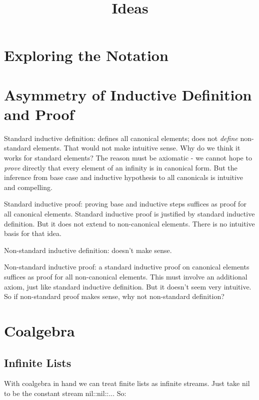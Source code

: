 \documentclass{article}
\begin{document}
\title{Ideas}
\maketitle
\large

\tableofcontents

\section{Exploring the Notation}


\section{Asymmetry of Inductive Definition and Proof}

Standard inductive definition: defines all canonical elements; does
not \emph{define} non-standard elements.  That would not make
intuitive sense.  Why do we think it works for standard elements?  The
reason must be axiomatic - we cannot hope to \emph{prove} directly
that every element of an infinity is in canonical form.  But the
inference from base case and inductive hypothesis to all canonicals is
intuitive and compelling.

Standard inductive proof: proving base and inductive steps suffices as
proof for all canonical elements.  Standard inductive proof is
justified by standard inductive definition.  But it does not extend to
non-canonical elements.  There is no intuitive basis for that idea.

Non-standard inductive definition:  doesn't make sense.

Non-standard inductive proof: a standard inductive proof on canonical
elements suffices as proof for all non-canonical elements.  This must
involve an additional axiom, just like standard inductive definition.
But it doesn't seem very intuitive.  So if non-standard proof makes
sense, why not non-standard definition?

\section{Coalgebra}

\subsection{Infinite Lists}

With coalgebra in hand we can treat finite lists as infinite streams.
Just take nil to be the constant stream nil::nil::...  So:
\end{document}
